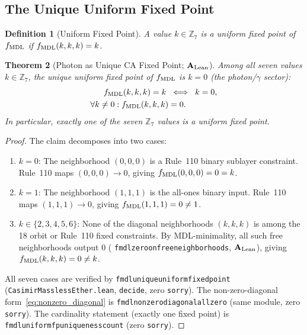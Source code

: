\documentclass[11pt]{article}
\newtheorem{theorem}{Theorem}[section]
\newtheorem{definition}[theorem]{Definition}
\theoremstyle{remark}
\newcommand{\lean}[1]{%
  \penalty-100
  \begingroup\def\_{\textunderscore\allowbreak}\texttt{#1}\endgroup}
\newcommand{\CatAL}{\ensuremath{\textbf{A}_{\rm Lean}}}
\begin{document}
\subsection{The Unique Uniform Fixed Point}
\label{sec:photon_fixed_point}

\begin{definition}[Uniform Fixed Point]
\label{def:uniform_fp}
A value $k \in \mathbb{Z}_7$ is a \emph{uniform fixed point} of $f_{\rm MDL}$
if $f_{\rm MDL}(k, k, k) = k$.
\end{definition}

\begin{theorem}[Photon as Unique CA Fixed Point; $\CatAL$]
\label{thm:photon_fixed_point}
Among all seven values $k \in \mathbb{Z}_7$, the unique uniform fixed point of
$f_{\rm MDL}$ is $k = 0$ (the photon/$\gamma$ sector):
\begin{align}
  f_{\rm MDL}(k,k,k) = k \;&\iff\; k = 0,
  \label{eq:photon_fp}\\
  \forall k \neq 0 : f_{\rm MDL}(k,k,k) &= 0.
  \label{eq:nonzero_diagonal}
\end{align}
In particular, exactly one of the seven $\mathbb{Z}_7$ values is a uniform
fixed point.
\end{theorem}

\begin{proof}
The claim decomposes into two cases:
\begin{enumerate}[nosep,leftmargin=1.5em]
\item $k = 0$: The neighborhood $(0,0,0)$ is a Rule~110 binary sublayer
  constraint.  Rule~110 maps $(0,0,0) \to 0$, giving $f_{\rm MDL}(0,0,0) = 0 = k$.
\item $k = 1$: The neighborhood $(1,1,1)$ is the all-ones binary input.
  Rule~110 maps $(1,1,1) \to 0$, giving $f_{\rm MDL}(1,1,1) = 0 \neq 1$.
\item $k \in \{2,3,4,5,6\}$: None of the diagonal neighborhoods $(k,k,k)$
  is among the 18 orbit or Rule~110 fixed constraints.
  By MDL-minimality, all such free neighborhoods output $0$
  (\lean{fmdl\_zero\_on\_free\_neighborhoods}, $\CatAL$), giving
  $f_{\rm MDL}(k,k,k) = 0 \neq k$.
\end{enumerate}
All seven cases are verified by
\lean{fmdl\_unique\_uniform\_fixed\_point}
(\texttt{CasimirMasslessEther.lean},
\lean{decide}, zero \texttt{sorry}).
The non-zero-diagonal form~\eqref{eq:nonzero_diagonal} is
\lean{fmdl\_nonzero\_diagonal\_all\_zero}
(same module, zero \texttt{sorry}).
The cardinality statement (exactly one fixed point) is
\lean{fmdl\_uniform\_fp\_uniqueness\_count}
(zero \texttt{sorry}).
\end{proof}
\end{document}
